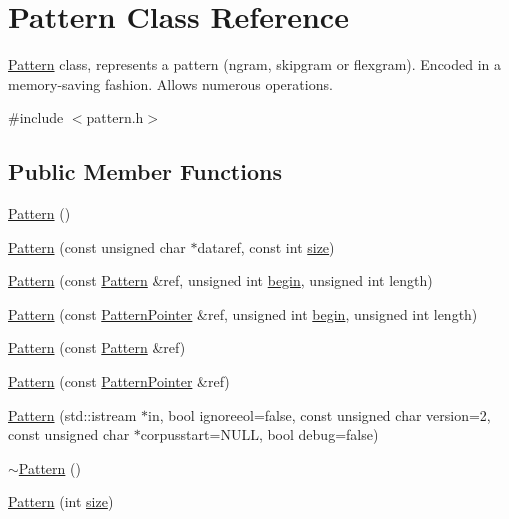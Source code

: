 \hypertarget{classPattern}{}\section{Pattern Class Reference}
\label{classPattern}


\hyperlink{classPattern}{Pattern} class, represents a pattern (ngram, skipgram or flexgram). Encoded in a memory-\/saving fashion. Allows numerous operations.  




{\ttfamily \#include $<$pattern.\+h$>$}

\subsection*{Public Member Functions}
\begin{DoxyCompactItemize}
\item 
\hyperlink{classPattern_a95f42b0f1717d9e6c2d831e87d27f83c}{Pattern} ()
\item 
\hyperlink{classPattern_a4b345a9704f37489492d769073abe964}{Pattern} (const unsigned char $\ast$dataref, const int \hyperlink{classPattern_a400a18c6a1b6de3eb574b6a0f12c9ca2}{size})
\item 
\hyperlink{classPattern_acba6b63b28a901e6262d1644822c3457}{Pattern} (const \hyperlink{classPattern}{Pattern} \&ref, unsigned int \hyperlink{benchmarks_8cpp_ac7fa37beaab207886901b58632083209}{begin}, unsigned int length)
\item 
\hyperlink{classPattern_ab058696b591b0a157cca3037abcd4afc}{Pattern} (const \hyperlink{classPatternPointer}{Pattern\+Pointer} \&ref, unsigned int \hyperlink{benchmarks_8cpp_ac7fa37beaab207886901b58632083209}{begin}, unsigned int length)
\item 
\hyperlink{classPattern_a9b69825f6e0b1f741be370ac1cbd1b4d}{Pattern} (const \hyperlink{classPattern}{Pattern} \&ref)
\item 
\hyperlink{classPattern_a5731960d41f0f7ffa3e8b03bb519f8b5}{Pattern} (const \hyperlink{classPatternPointer}{Pattern\+Pointer} \&ref)
\item 
\hyperlink{classPattern_a2e658978ef6c0e82ccc85f0b7e59407b}{Pattern} (std\+::istream $\ast$in, bool ignoreeol=false, const unsigned char version=2, const unsigned char $\ast$corpusstart=N\+U\+L\+L, bool debug=false)
\item 
\hyperlink{classPattern_a6e8b9388bbd39934e9f9534b974d7498}{$\sim$\+Pattern} ()
\item 
\hyperlink{classPattern_a80041c82ee57093f673677b22906bbf8}{Pattern} (int \hyperlink{classPattern_a400a18c6a1b6de3eb574b6a0f12c9ca2}{size})

\end{DoxyCompactItemize}
